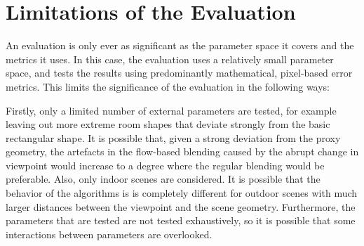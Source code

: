 
\section{Limitations of the Evaluation}\label{sec:limitations}
An evaluation is only ever as significant as the parameter space it covers and the metrics it uses. In this case, the evaluation uses a relatively small parameter space, and tests the results using predominantly mathematical, pixel-based error metrics. This limits the significance of the evaluation in the following ways:

Firstly, only a limited number of external parameters are tested, for example leaving out more extreme room shapes that deviate strongly from the basic rectangular shape. It is possible that, given a strong deviation from the proxy geometry, the artefacts in the flow-based blending caused by the abrupt change in viewpoint would increase to a degree where the regular blending would be preferable. Also, only indoor scenes are considered. It is possible that the behavior of the algorithms is is completely different for outdoor scenes with much larger distances between the viewpoint and the scene geometry. Furthermore, the parameters that are tested are not tested exhaustively, so it is possible that some interactions between parameters are overlooked.

